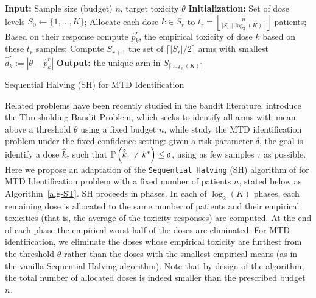 \begin{algorithm}
\begin{algorithmic}
\STATE \textbf{Input:} Sample size (budget) $n$, target toxicity $\theta$
\STATE \textbf{Initialization:} Set of dose levels $S_0 \leftarrow \{1, \dots, K\}$;
    \STATE Allocate each dose $k \in S_r$ to $t_r = \left\lfloor\frac{n}{|S_r|\lceil\log_2(K)\rceil}\right\rfloor$ patients; 
    \STATE Based on their response compute $\hat p_k^r$, the empirical toxicity of dose $k$ based on these $t_r$ samples;
    \STATE Compute $S_{r+1}$ the set of $\lceil|S_r|/2\rceil$ arms with 
        smallest $\hat d_k^r:=|\theta - \hat{p}_k^r|$
  \ENDFOR
\STATE \textbf{Output:} the unique arm in  $S_{\lceil{\log_2(K)}\rceil}$
\end{algorithmic}
\caption{Sequential Halving (SH) for MTD Identification\label{alg-ST}}
\end{algorithm}

Related problems have been recently studied in the bandit literature. \cite{Locatelli16Thres} introduce the Thresholding Bandit Problem, which seeks to identify all arms with mean above a threshold $\theta$ using a fixed budget $n$, while  \cite{Garivier17DF} study the MTD identification problem under the fixed-confidence setting: given a risk parameter $\delta$, the goal is identify a dose $\hat{k}_\tau$  such that $\mathbb{P}\left(\hat{k}_\tau \neq k^*\right) \leq \delta$, using as few samples $\tau$ as possible. Here we propose an adaptation of the \texttt{Sequential Halving} (SH) algorithm of \cite{Karnin13} for MTD Identification problem with a fixed number of patients $n$, stated below as Algorithm~\ref{alg-ST}. SH proceeds in phases. In each of $\log_2(K)$ phases, each remaining dose is allocated to the same number of patients and their empirical toxicities (that is, the average of the toxicity responses) are computed. At the end of each phase the empirical worst half of the doses are eliminated. For MTD identification, 
we eliminate the doses whose empirical toxicity are furthest from the threshold $\theta$
rather than the doses with the smallest empirical means (as in the vanilla Sequential Halving algorithm).
Note that by design of the algorithm, the total number of allocated doses is indeed smaller than the prescribed budget $n$.  



